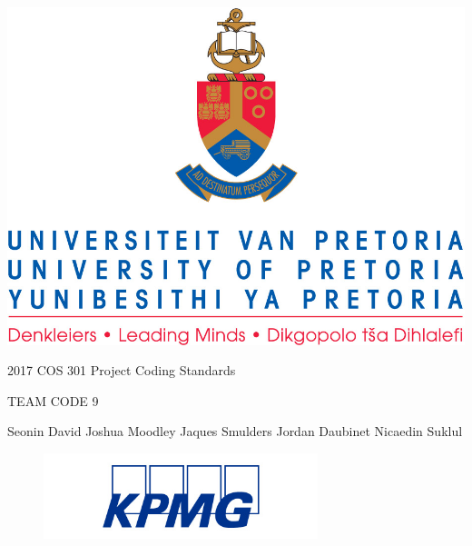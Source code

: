 \documentclass{article}
\begin{document}
    
    \begin{center}
        \includegraphics{Graphics/uplogo.jpg}
        
        {\Huge 
        2017 COS 301 Project \linebreak
        Coding Standards \linebreak 
        \par}
        
        {\Huge
        TEAM CODE 9
        \linebreak
        \par}
        
        \begin{LARGE}
            Seonin David
            \linebreak
            \linebreak
            Joshua Moodley
            \linebreak
            \linebreak
            Jaques Smulders
            \linebreak
            \linebreak
            Jordan Daubinet
            \linebreak
            \linebreak
            Nicaedin Suklul
        \end{LARGE}
    \end{center}
    
    \begin{figure}[b]
    \centering
        \includegraphics[width=8cm]{Graphics/kpmgLogo.jpg}
    \end{figure}
    
\end{document}
